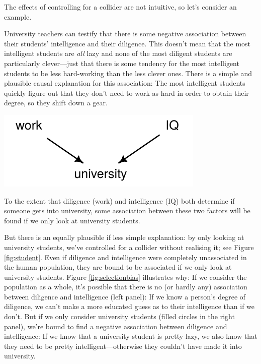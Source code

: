 \documentclass[a4paper]{tufte-book}\usepackage[]{graphicx}\usepackage[]{xcolor}
\begin{document}
The effects of controlling for a collider are not intuitive, so let's
consider an example.

University teachers can testify that there is some negative association
between their students' intelligence and their diligence. 
This doesn't mean that the most intelligent students are \emph{all} lazy and 
none of the most diligent students
are particularly clever---just that there is some tendency for the most intelligent
students to be less hard-working than the less clever ones.
There is a simple and plausible causal explanation for this association:
The most intelligent students quickly figure out that they don't need to work
as hard in order to obtain their degree, so they shift down a gear.

\begin{marginfigure}[3.5cm]
\includegraphics[width=\textwidth]{figure/student}
\caption{To the extent that diligence (work) and intelligence (IQ) both determine
if someone gets into university, some association between these two factors will
be found if we only look at university students.}
\label{fig:student}
\end{marginfigure}

But there is an equally plausible if less simple explanation: by only looking
at university students, we've controlled for a collider without realising it;
see Figure \ref{fig:student}. 
Even if diligence and intelligence were completely
unassociated in the human population, they are bound to be associated if we
only look at university students.
Figure \vref{fig:selectionbias} illustrates why:
If we consider
  the population as a whole, it's possible that there is no (or hardly any) association
  between diligence and intelligence (left panel): If we know a person's degree of diligence,
  we can't make a more educated guess as to their intelligence than if we don't.
  But if we only consider university students (filled circles in the right panel), we're
  bound to find a negative association between diligence and intelligence: If we
  know that a university student is pretty lazy, we also know that they need
  to be pretty intelligent---otherwise they couldn't have made it into university.
\end{document}
